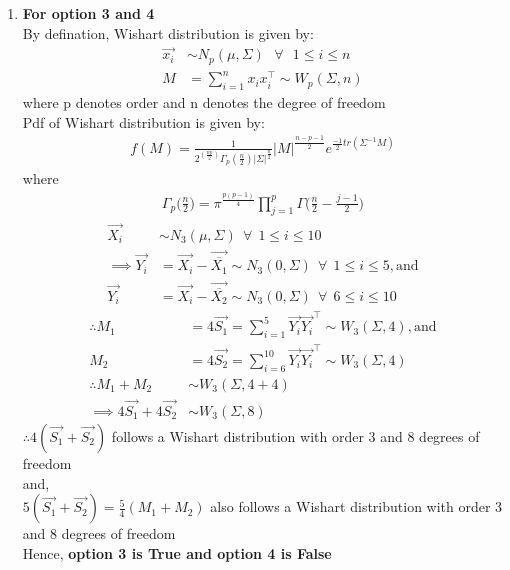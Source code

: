 \documentclass[journal,12pt,twocolumn]{IEEEtran}
\theoremstyle{remark}
\begin{document}
\begin{enumerate}
\item \textbf{For option 3 and 4}\\
By defination, Wishart distribution is given by:
\begin{align}
	\vec{x_i} &\sim N_p(\mu,\Sigma) \ \ \ \forall \ \ \ 1 \leq i \leq n\\
	M &= \sum_{i=1}^n x_ix_i^\top \sim W_p(\Sigma,n)
\end{align}
where p denotes order and n denotes the degree of freedom\\
Pdf of Wishart distribution is given by:
\begin{align}
	f(M) = \frac{1}{2^(\frac{np}{2})\Gamma_p(\frac{n}{2})|\Sigma|^\frac{n}{2}}|M|^\frac{n-p-1}{2}e^{\frac{-1}{2}tr(\Sigma^{-1}M)}
\end{align}
where
\begin{align}
	\Gamma_p\biggl(\frac{n}{2}\biggr) = \pi^{\frac{p(p-1)}{4}}\prod_{j=1}^{p}\Gamma\biggl(\frac{n}{2}-\frac{j-1}{2}\biggr)
\end{align}
\begin{align}
	\vec{X_i} &\sim N_3(\mu,\Sigma) \ \ \forall \ \ 1\leq i\leq 10\\
	\implies \vec{Y_i} &= \vec{X_i} - \vec{\overline{X_1}} \sim N_3(0,\Sigma) \ \ \forall\ \  1\leq i\leq 5, \text{and}\\
	\vec{Y_i} &= \vec{X_i} - \vec{\overline{X_2}} \sim N_3(0,\Sigma) \ \ \forall\ \  6\leq i\leq 10
\end{align}
\begin{align}
	\therefore M_1 &= 4\vec{S_1} = \sum_{i=1}^{5}\vec{Y_i}\vec{Y_i}^\top \sim W_{3}(\Sigma,4), \text{and}\\
	M_2 &= 4\vec{S_2} = \sum_{i=6}^{10}\vec{Y_i}\vec{Y_i}^\top \sim W_{3}(\Sigma,4)\\
	\therefore M_1+M_2 &\sim W_3(\Sigma,4+4)\\
	\implies 4\vec{S_1}+4\vec{S_2} &\sim W_3(\Sigma,8)
\end{align}
$\therefore 4(\vec{S_1}+\vec{S_2})$ follows a Wishart distribution with order 3 and 8 degrees of freedom\\
and,\\
$5(\vec{S_1}+\vec{S_2}) = \frac{5}{4}(M_1+M_2)$ also follows a Wishart distribution with order 3 and 8 degrees of freedom\\
Hence, \textbf{option 3 is True and option 4 is False}
\end{enumerate}
\end{document}
